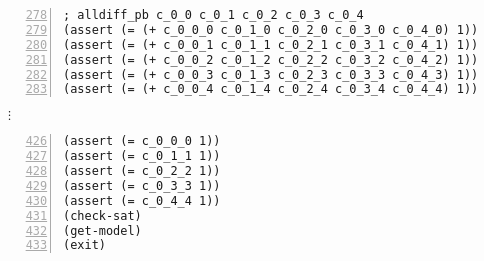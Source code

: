 \begin{lstlisting}[frame=rl,numbers=left,breaklines=true,%
columns=fullflexible,keepspaces=true,%
basicstyle=\ttfamily\scriptsize,firstnumber=278]
; alldiff_pb c_0_0 c_0_1 c_0_2 c_0_3 c_0_4
(assert (= (+ c_0_0_0 c_0_1_0 c_0_2_0 c_0_3_0 c_0_4_0) 1))
(assert (= (+ c_0_0_1 c_0_1_1 c_0_2_1 c_0_3_1 c_0_4_1) 1))
(assert (= (+ c_0_0_2 c_0_1_2 c_0_2_2 c_0_3_2 c_0_4_2) 1))
(assert (= (+ c_0_0_3 c_0_1_3 c_0_2_3 c_0_3_3 c_0_4_3) 1))
(assert (= (+ c_0_0_4 c_0_1_4 c_0_2_4 c_0_3_4 c_0_4_4) 1))
\end{lstlisting}
$\vdots$

\begin{lstlisting}[frame=rbl,numbers=left,breaklines=true,%
columns=fullflexible,keepspaces=true,%
basicstyle=\ttfamily\scriptsize,firstnumber=426,%
captionpos=b,caption={N=5の0-1変数のみを用いた色変数モデルのクイーングラフ彩色問題},label={code:qgcp_5_pb}]
(assert (= c_0_0_0 1))
(assert (= c_0_1_1 1))
(assert (= c_0_2_2 1))
(assert (= c_0_3_3 1))
(assert (= c_0_4_4 1))
(check-sat)
(get-model)
(exit)
\end{lstlisting}
